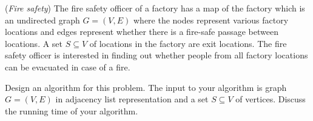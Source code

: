 \documentclass{exam}
\begin{document}
\begin{questions}



\vspace{0.3in}


\question[20] ({\it Fire safety}) The fire safety officer of a factory has a map of the factory which is an undirected graph $G = (V, E)$ where the nodes represent various factory locations and edges represent whether there is a fire-safe passage between locations. A set $S \subseteq V$ of locations in the factory are exit locations. The fire safety officer is interested in finding out whether people from all factory locations can be evacuated in case of a fire.

Design an algorithm for this problem. The input to your algorithm is  graph $G = (V, E)$ in adjacency list representation and a set $S \subseteq V$ of vertices. Discuss the running time of your algorithm.\\

\begin{algorithm}
	\DontPrintSemicolon
\end{algorithm}


\end{questions}
\end{document}

